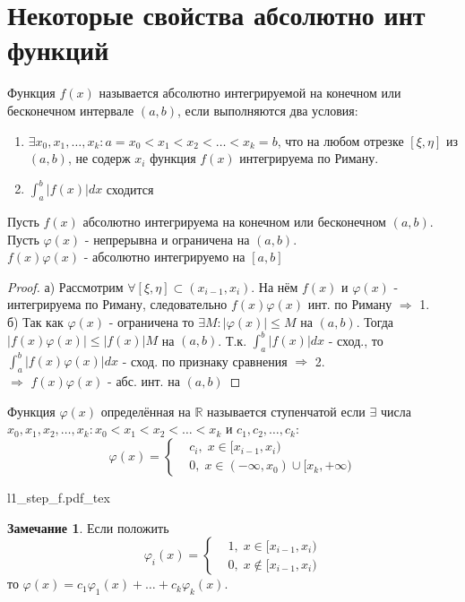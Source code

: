 \documentclass{article}
\newcommand{\incfig}[2][1]{%
    \def\svgwidth{#1\columnwidth}
    \hbox{{#2.pdf_tex}}
}
\theoremstyle{definition}
\numberwithin{theorem}{section}
\numberwithin{lemma}{section}
\numberwithin{definition}{section}
\numberwithin{corollary}{section}
\newtheorem*{remark}{Замечание}
\numberwithin{equation}{section}
\let\phi\varphi
\let\implies\Rightarrow
\newcommand\R{\ensuremath{\mathbb{R}}}
\begin{document}
\section{Некоторые свойства абсолютно инт функций}
\begin{definition}
  Функция $f(x)$ называется абсолютно интегрируемой на конечном или бесконечном интервале $(a,b)$,
  если выполняются два условия:
  \begin{enumerate}
    \item $\exists x_0,x_1,\dots,x_k:a=x_0<x_1<x_2<\dots<x_k=b$, что на любом отрезке
      $[\xi,\eta]$ из $(a,b)$, не содерж $x_i$ функция $f(x)$ интегрируема по Риману.
    \item $\int_{a}^{b}|f(x)|dx$ сходится
  \end{enumerate}
\end{definition}
\begin{lemma} \label{l1_abs_prod}
 Пусть $f(x)$ абсолютно интегрируема на конечном или бесконечном $(a,b)$.
 Пусть $\phi(x)$ - непрерывна и ограничена на $(a,b)$. \\
 $f(x)\phi(x)$ - абсолютно интегрируемо на $[a,b]$
\end{lemma}
\begin{proof}
  а) Рассмотрим $\forall [\xi,\eta]\subset(x_{i-1},x_i)$. На нём $f(x)$ и $\phi(x)$ - интегрируема
  по Риману, следовательно $f(x)\phi(x)$ инт. по Риману $\implies$ 1. \\
  б) Так как $\phi(x)$ - ограничена то $\exists M:|\phi(x)|\le M$ на $(a,b)$.
  Тогда $|f(x)\phi(x)|\le|f(x)|M$ на $(a,b)$. Т.к. $\int_{a}^{b}|f(x)|dx$ - сход.,
  то $\int_{a}^{b}|f(x)\phi(x)|dx$ - сход. по признаку сравнения $\implies$ 2. \\
  $\implies$ $f(x)\phi(x)$ - абс. инт. на $(a,b)$
\end{proof}
\begin{definition}
  Функция $\phi(x)$ определённая на $\R$ называется ступенчатой если
  $\exists$ числа $x_0,x_1,x_2,\dots,x_k:x_0<x_1<x_2<\dots<x_k$ и
  $c_1,c_2,\dots,c_k$:
  \[
    \phi(x) = \left\{\begin{aligned}
      & c_i, \; x \in [x_{i-1},x_i) \\ 
      & 0, \; x \in (-\infty,x_0) \cup [x_k,+\infty)
    \end{aligned}\right.
  \]
\end{definition}
\incfig{l1_step_f}
\begin{remark}
  Если положить
  \[
    \phi_i(x) = \left\{\begin{aligned}
      & 1, \; x \in [x_{i-1}, x_i) \\ 
      & 0, \; x \notin [x_{i-1}, x_i)
    \end{aligned}\right.
  \]
  то $\phi(x)=c_1\phi_1(x)+\dots+c_k\phi_k(x)$.
\end{remark}
\end{document}
